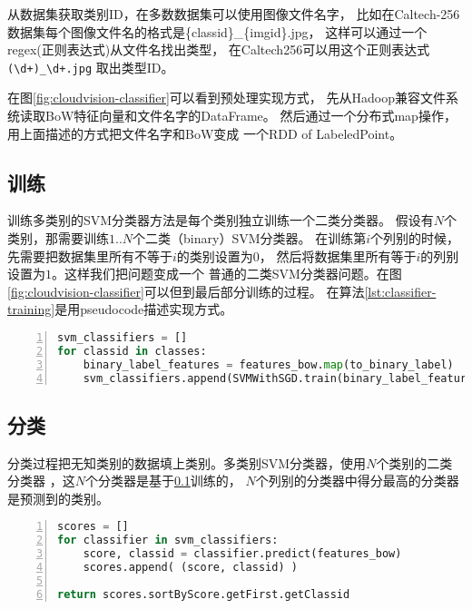 从数据集获取类别ID，在多数数据集可以使用图像文件名字，
比如在Caltech-256数据集每个图像文件名的格式是\{classid\}\_\{imgid\}.jpg，
这样可以通过一个regex(正则表达式)从文件名找出类型，
在Caltech256可以用这个正则表达式\verb|(\d+)_\d+.jpg|
取出类型ID。

在图\ref{fig:cloudvision-classifier}可以看到预处理实现方式，
先从Hadoop兼容文件系统读取BoW特征向量和文件名字的DataFrame。
然后通过一个分布式map操作，用上面描述的方式把文件名字和BoW变成
一个RDD of LabeledPoint。



\subsection{训练}
\label{subsec:classifier-training}
训练多类别的SVM分类器方法是每个类别独立训练一个二类分类器。
假设有$N$个类别，那需要训练$1..N$个二类（binary）SVM分类器。
在训练第$i$个列别的时候，先需要把数据集里所有不等于$i$的类别设置为$0$，
然后将数据集里所有等于$i$的列别设置为$1$。这样我们把问题变成一个
普通的二类SVM分类器问题。在图\ref{fig:cloudvision-classifier}可以但到最后部分训练的过程。
在算法\ref{lst:classifier-training}是用pseudocode描述实现方式。
\begin{lstlisting}[language=Python,
                   basicstyle=\small,
                   numbers=left,
                   showstringspaces=false,
                   caption={SVM多类别分类器训练pseudocode},
                   label={lst:classifier-training}]
svm_classifiers = []
for classid in classes:
    binary_label_features = features_bow.map(to_binary_label)
    svm_classifiers.append(SVMWithSGD.train(binary_label_features))
\end{lstlisting}



\subsection{分类}
\label{subsec:classifier-label}
分类过程把无知类别的数据填上类别。多类别SVM分类器，使用$N$个类别的二类分类器
，这$N$个分类器是基于\ref{subsec:classifier-training}训练的，
$N$个列别的分类器中得分最高的分类器是预测到的类别。
\begin{lstlisting}[language=Python,
                   basicstyle=\small,
                   numbers=left,
                   showstringspaces=false,
                   caption={SVM多类别分类器分类pseudocode},
                   label={lst:classifier-training}]
scores = []
for classifier in svm_classifiers:
    score, classid = classifier.predict(features_bow)
    scores.append( (score, classid) )

return scores.sortByScore.getFirst.getClassid
\end{lstlisting}




